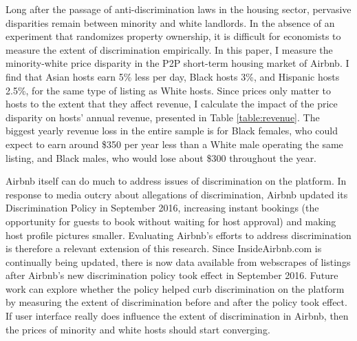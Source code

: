 
Long after the passage of anti-discrimination laws in the housing sector, pervasive disparities remain between minority and white landlords. In the absence of an experiment that randomizes property ownership, it is difficult for economists to measure the extent of discrimination empirically. In this paper, I measure the minority-white price disparity in the P2P short-term housing market of Airbnb. I find that Asian hosts earn 5\% less per day, Black hosts 3\%, and Hispanic hosts 2.5\%, for the same type of listing as White hosts. Since prices only matter to hosts to the extent that they affect revenue, I calculate the impact of the price disparity on hosts' annual revenue, presented in Table \ref{table:revenue}. The biggest yearly revenue loss in the entire sample is for Black females, who could expect to earn around \$350 per year less than a White male operating the same listing, and Black males, who would lose about \$300 throughout the year. 

Airbnb itself can do much to address issues of discrimination on the platform. In response to media outcry about allegations of discrimination, Airbnb updated its Discrimination Policy in September 2016, increasing instant bookings (the opportunity for guests to book without waiting for host approval) and making host profile pictures smaller. Evaluating Airbnb's efforts to address discrimination is therefore a relevant extension of this research. Since InsideAirbnb.com is continually being updated, there is now data available from webscrapes of listings after Airbnb's new discrimination policy took effect in September 2016. Future work can explore whether the policy helped curb discrimination on the platform by measuring the extent of discrimination before and after the policy took effect. If user interface really does influence the extent of discrimination in Airbnb, then the prices of minority and white hosts should start converging. 


